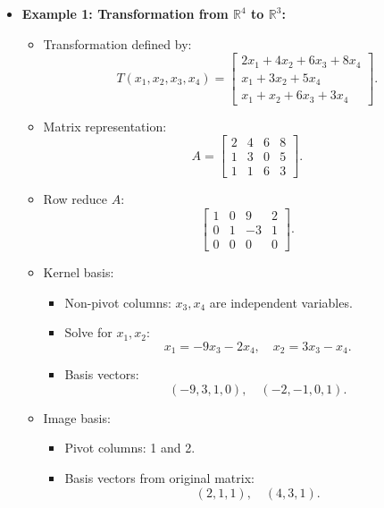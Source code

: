 \documentclass{article}
\begin{document}
\begin{itemize}
  \item \textbf{Example 1: Transformation from $\mathbb{R}^4$ to $\mathbb{R}^3$:}
    \begin{itemize}
      \item Transformation defined by:
        \[
          T(x_1, x_2, x_3, x_4) =
          \begin{bmatrix}
            2x_1 + 4x_2 + 6x_3 + 8x_4 \\
            x_1 + 3x_2 + 5x_4 \\
            x_1 + x_2 + 6x_3 + 3x_4
          \end{bmatrix}.
        \]
      \item Matrix representation:
        \[
          A =
          \begin{bmatrix}
            2 & 4 & 6 & 8 \\
            1 & 3 & 0 & 5 \\
            1 & 1 & 6 & 3
          \end{bmatrix}.
        \]
      \item Row reduce $A$:
        \[
          \begin{bmatrix}
            1 & 0 & 9 & 2 \\
            0 & 1 & -3 & 1 \\
            0 & 0 & 0 & 0
          \end{bmatrix}.
        \]
      \item Kernel basis:
        \begin{itemize}
          \item Non-pivot columns: $x_3, x_4$ are independent variables.
          \item Solve for $x_1, x_2$:
            \[
              x_1 = -9x_3 - 2x_4, \quad x_2 = 3x_3 - x_4.
            \]
          \item Basis vectors:
            \[
              (-9, 3, 1, 0), \quad (-2, -1, 0, 1).
            \]
        \end{itemize}
      \item Image basis:
        \begin{itemize}
          \item Pivot columns: 1 and 2.
          \item Basis vectors from original matrix:
            \[
              (2, 1, 1), \quad (4, 3, 1).
            \]
        \end{itemize}
    \end{itemize}


\end{itemize}
\end{document}
